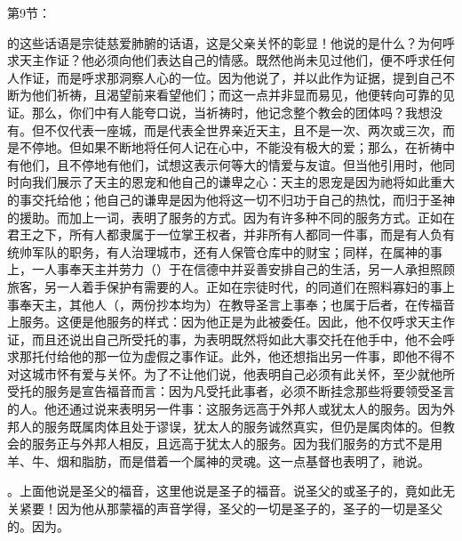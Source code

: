 第9节：\par

的这些话语是宗徒慈爱肺腑的话语，这是父亲关怀的彰显！他说的是什么？为何呼求天主作证？他必须向他们表达自己的情感。既然他尚未见过他们，便不呼求任何人作证，而是呼求那洞察人心的一位。因为他说了，并以此作为证据，提到自己不断为他们祈祷，且渴望前来看望他们；而这一点并非显而易见，他便转向可靠的见证。那么，你们中有人能夸口说，当祈祷时，他记念整个教会的团体吗？我想没有。但不仅代表一座城，而是代表全世界亲近天主，且不是一次、两次或三次，而是不停地。但如果不断地将任何人记在心中，不能没有极大的爱；那么，在祈祷中有他们，且不停地有他们，试想这表示何等大的情爱与友谊。但当他引用时，他同时向我们展示了天主的恩宠和他自己的谦卑之心：天主的恩宠是因为祂将如此重大的事交托给他；他自己的谦卑是因为他将这一切不归功于自己的热忱，而归于圣神的援助。而加上一词，表明了服务的方式。因为有许多种不同的服务方式。正如在君王之下，所有人都隶属于一位掌王权者，并非所有人都同一件事，而是有人负有统帅军队的职务，有人治理城市，还有人保管仓库中的财宝；同样，在属神的事上，一人事奉天主并劳力（）于在信德中并妥善安排自己的生活，另一人承担照顾旅客，另一人着手保护有需要的人。正如在宗徒时代，的同道们在照料寡妇的事上事奉天主，其他人（，两份抄本均为）在教导圣言上事奉；也属于后者，在传福音上服务。这便是他服务的样式：因为他正是为此被委任。因此，他不仅呼求天主作证，而且还说出自己所受托的事，为表明既然将如此大事交托在他手中，他不会呼求那托付给他的那一位为虚假之事作证。此外，他还想指出另一件事，即他不得不对这城市怀有爱与关怀。为了不让他们说，他表明自己必须有此关怀，至少就他所受托的服务是宣告福音而言：因为凡受托此事者，必须不断挂念那些将要领受圣言的人。他还通过说来表明另一件事：这服务远高于外邦人或犹太人的服务。因为外邦人的服务既属肉体且处于谬误，犹太人的服务诚然真实，但仍是属肉体的。但教会的服务正与外邦人相反，且远高于犹太人的服务。因为我们服务的方式不是用羊、牛、烟和脂肪，而是借着一个属神的灵魂。这一点基督也表明了，祂说。\par

。上面他说是圣父的福音，这里他说是圣子的福音。说圣父的或圣子的，竟如此无关紧要！因为他从那蒙福的声音学得，圣父的一切是圣子的，圣子的一切是圣父的。因为。\par

